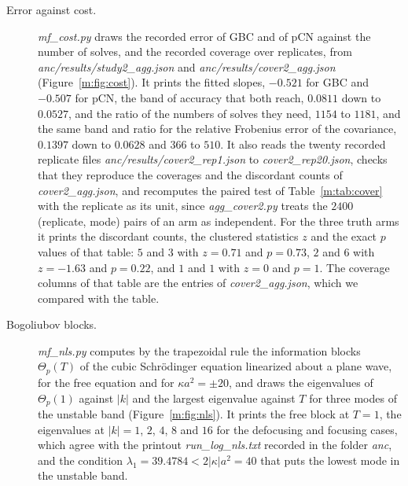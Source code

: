 \begin{description}
\item[Error against cost.] \textit{mf\_cost.py} draws the recorded error of GBC and of pCN against the number of solves, and the recorded coverage over replicates, from \textit{anc/results/study2\_agg.json} and \textit{anc/results/cover2\_agg.json} (Figure~\ref{m:fig:cost}). It prints the fitted slopes, $-0.521$ for GBC and $-0.507$ for pCN, the band of accuracy that both reach, $0.0811$ down to $0.0527$, and the ratio of the numbers of solves they need, $1154$ to $1181$, and the same band and ratio for the relative Frobenius error of the covariance, $0.1397$ down to $0.0628$ and $366$ to $510$. It also reads the twenty recorded replicate files \textit{anc/results/cover2\_rep1.json} to \textit{cover2\_rep20.json}, checks that they reproduce the coverages and the discordant counts of \textit{cover2\_agg.json}, and recomputes the paired test of Table~\ref{m:tab:cover} with the replicate as its unit, since \textit{agg\_cover2.py} treats the $2400$ (replicate, mode) pairs of an arm as independent. For the three truth arms it prints the discordant counts, the clustered statistics $z$ and the exact $p$ values of that table: $5$ and $3$ with $z=0.71$ and $p=0.73$, $2$ and $6$ with $z=-1.63$ and $p=0.22$, and $1$ and $1$ with $z=0$ and $p=1$. The coverage columns of that table are the entries of \textit{cover2\_agg.json}, which we compared with the table.
\item[Bogoliubov blocks.] \textit{mf\_nls.py} computes by the trapezoidal rule the information blocks $\Theta_p(T)$ of the cubic Schr\"odinger equation linearized about a plane wave, for the free equation and for $\kappa a^2=\pm20$, and draws the eigenvalues of $\Theta_p(1)$ against $|k|$ and the largest eigenvalue against $T$ for three modes of the unstable band (Figure~\ref{m:fig:nls}). It prints the free block at $T=1$, the eigenvalues at $|k|=1$, $2$, $4$, $8$ and $16$ for the defocusing and focusing cases, which agree with the printout \textit{run\_log\_nls.txt} recorded in the folder \textit{anc}, and the condition $\lambda_1=39.4784<2|\kappa|a^2=40$ that puts the lowest mode in the unstable band.

\end{description}
